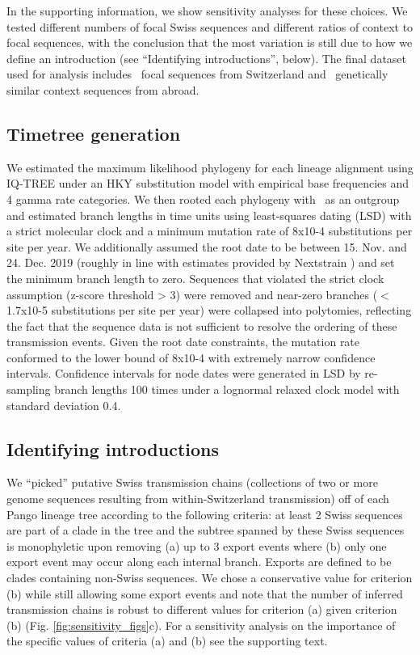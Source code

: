 \documentclass[9pt,twoside,lineno]{pnas-new} %
\begin{document}
In the supporting information, we show sensitivity analyses for these choices. We tested different numbers of focal Swiss sequences and different ratios of context to focal sequences, with the conclusion that the most variation is still due to how we define an introduction (see ``Identifying introductions'', below). The final dataset used for analysis includes \nfocalsamples\ focal sequences from Switzerland and \nsimcontext\ genetically similar context sequences from abroad.

\subsection*{Timetree generation}
We estimated the maximum likelihood phylogeny for each lineage alignment using IQ-TREE \cite{Nguyen2014} under an HKY substitution model \cite{Hasegawa1985} with empirical base frequencies and 4 gamma rate categories. We then rooted each phylogeny with \outgroupgisaidepiisls\ as an outgroup and estimated branch lengths in time units using least-squares dating (LSD) \cite{To2016} with a strict molecular clock and a minimum mutation rate of 8x10-4 substitutions per site per year. We additionally assumed the root date to be between 15. Nov. and 24. Dec. 2019 (roughly in line with estimates provided by Nextstrain \cite{Nextstrainteam}) and set the minimum branch length to zero. Sequences that violated the strict clock assumption (z-score threshold > 3) were removed and near-zero branches ($<$1.7x10-5 substitutions per site per year) were collapsed into polytomies, reflecting the fact that the sequence data is not sufficient to resolve the ordering of these transmission events. Given the root date constraints, the mutation rate conformed to the lower bound of 8x10-4 with extremely narrow confidence intervals. Confidence intervals for node dates were generated in LSD by re- sampling branch lengths 100 times under a lognormal relaxed clock model with standard deviation 0.4.

\subsection*{Identifying introductions}
We ``picked'' putative Swiss transmission chains (collections of two or more genome sequences resulting from within-Switzerland transmission) off of each Pango lineage tree according to the following criteria: at least 2 Swiss sequences are part of a clade in the tree and the subtree spanned by these Swiss sequences is monophyletic upon removing (a) up to 3 export events where (b) only one export event may occur along each internal branch. Exports are defined to be clades containing non-Swiss sequences. We chose a conservative value for criterion (b) while still allowing some export events and note that the number of inferred transmission chains is robust to different values for criterion (a) given criterion (b) (Fig. \ref{fig:sensitivity_figs}c). For a sensitivity analysis on the importance of the specific values of criteria (a) and (b) see the supporting text.
\end{document}
